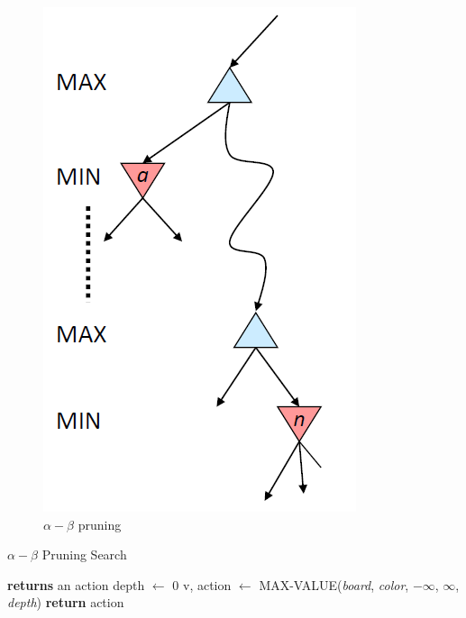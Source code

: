 \documentclass[a4paper, 11pt]{article} %
\begin{document}
\begin{multicols}{2}
	 \begin{figure}[H]
		\centering
		\parbox{0.25\linewidth}{
			\includegraphics[width=\linewidth]{pruning.png}
		}
		\caption{$\alpha-\beta$ pruning}
	\end{figure}
	\begin{algorithm}[H]
		\caption{$\alpha-\beta$ Pruning Search}
		\small
		\begin{algorithmic}[1]
			 \textbf{returns} an action
			\State depth $\leftarrow$ 0
			\State v, action $\leftarrow$ \textsc{MAX-VALUE}(\textit{board}, \textit{color}, $-\infty$, $\infty$, \textit{depth})
			\State \textbf{return} action\\

\end{algorithmic}
\end{algorithm}
\end{multicols}
\end{document}
